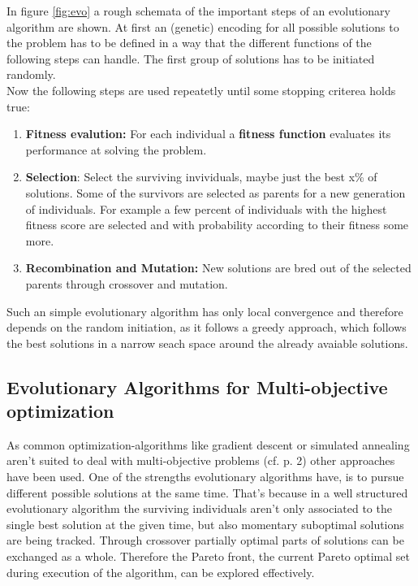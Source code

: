 \documentclass[12pt,twoside]{article}
\theoremstyle{plain}
\theoremstyle{definition}
\theoremstyle{remark}
\begin{document}
In figure \ref{fig:evo} a rough schemata of the important steps of an evolutionary algorithm are shown. At first an (genetic) encoding for all possible solutions to the problem has to be defined in a way that the different functions of the following steps can handle. The first group of solutions has to be initiated randomly.\\

Now the following steps are used repeatetly until some stopping criterea holds true:
\begin{enumerate}
	\item \textbf{Fitness evalution:} For each individual a \textbf{fitness function} evaluates its performance at solving the problem.
	\item \textbf{Selection}: Select the surviving invividuals, maybe just the best x\% of solutions. Some of the survivors are selected as parents for a new generation of individuals. For example a few percent of individuals with the highest fitness score are selected and with probability according to their fitness some more.
	\item \textbf{Recombination and Mutation:} New solutions are bred out of the selected parents through crossover and mutation.
\end{enumerate}

Such an simple evolutionary algorithm has only local convergence and therefore depends on the random initiation, as it follows a greedy approach, which follows the best solutions in a narrow seach space around the already avaiable solutions.

\subsection{Evolutionary Algorithms for Multi-objective optimization}
\label{back:evo_in_multi-opt}
As common optimization-algorithms like gradient descent or simulated annealing aren't suited to deal with multi-objective problems (cf. \cite{fonseca1995overview} p. 2) other approaches have been used.
One of the strengths evolutionary algorithms have, is to pursue different possible solutions at the same time. That's because in a well structured evolutionary algorithm the surviving individuals aren't only associated to the single best solution at the given time, but also momentary suboptimal solutions are being tracked.
Through crossover partially optimal parts of solutions can be exchanged as a whole. 
Therefore the Pareto front, the current Pareto optimal set during execution of the algorithm, can be explored effectively.
\end{document}
